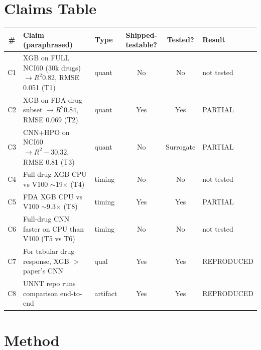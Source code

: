 \documentclass[11pt]{article}
\begin{document}
\section{Claims Table}

\begin{longtable}{@{}c p{7.2cm} l c c l@{}}
\toprule
\# & Claim (paraphrased) & Type & Shipped-testable? & Tested? & Result \\
\midrule
\endhead
C1 & XGB on FULL NCI60 (30k drugs) $\to R^2 0.82$, RMSE 0.051 (T1) & quant & No & No & not tested \\
C2 & XGB on FDA-drug subset $\to R^2 0.84$, RMSE 0.069 (T2) & quant & Yes & Yes & PARTIAL \\
C3 & CNN+HPO on NCI60 $\to R^2 -30.32$, RMSE 0.81 (T3) & quant & No & Surrogate & PARTIAL \\
C4 & Full-drug XGB CPU vs V100 $\sim$19$\times$ (T4) & timing & No & No & not tested \\
C5 & FDA XGB CPU vs V100 $\sim$9.3$\times$ (T8) & timing & Yes & Yes & PARTIAL \\
C6 & Full-drug CNN faster on CPU than V100 (T5 vs T6) & timing & No & No & not tested \\
C7 & For tabular drug-response, XGB $>$ paper's CNN & qual & Yes & Yes & REPRODUCED \\
C8 & UNNT repo runs comparison end-to-end & artifact & Yes & Yes & REPRODUCED \\
\bottomrule
\end{longtable}

\section{Method}
\end{document}
